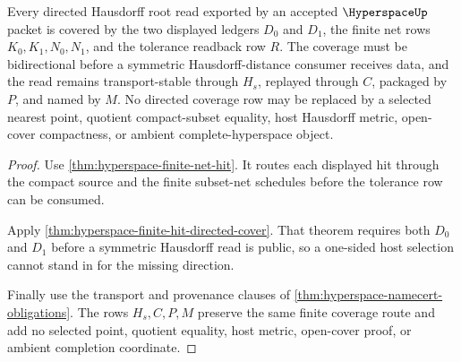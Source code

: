 \begin{theorem}
\label{thm:hyperspace-directed-hausdorff-root-coverage}
Every directed Hausdorff root read exported by an accepted $\HyperspaceUp$ packet is covered by the two displayed ledgers $D_0$ and $D_1$, the finite net rows $K_0,K_1,N_0,N_1$, and the tolerance readback row $R$. The coverage must be bidirectional before a symmetric Hausdorff-distance consumer receives data, and the read remains transport-stable through $H_s$, replayed through $C$, packaged by $P$, and named by $M$. No directed coverage row may be replaced by a selected nearest point, quotient compact-subset equality, host Hausdorff metric, open-cover compactness, or ambient complete-hyperspace object.
\end{theorem}
\begin{proof}
Use \autoref{thm:hyperspace-finite-net-hit}. It routes each displayed hit through the compact source and the finite subset-net schedules before the tolerance row can be consumed.

Apply \autoref{thm:hyperspace-finite-hit-directed-cover}. That theorem requires both $D_0$ and $D_1$ before a symmetric Hausdorff read is public, so a one-sided host selection cannot stand in for the missing direction.

Finally use the transport and provenance clauses of \autoref{thm:hyperspace-namecert-obligations}. The rows $H_s,C,P,M$ preserve the same finite coverage route and add no selected point, quotient equality, host metric, open-cover proof, or ambient completion coordinate.
\end{proof}

